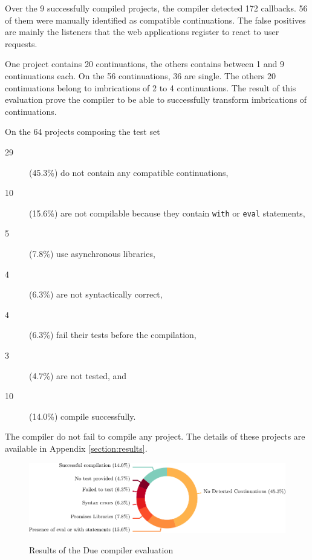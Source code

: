 Over the 9 successfully compiled projects, the compiler detected 172 callbacks.
56 of them were manually identified as compatible continuations.
The false positives are mainly the listeners that the web applications register to react to user requests.

One project contains 20 continuations, the others contains between 1 and 9 continuations each.
On the 56 continuations, 36 are single. %
The others 20 continuations belong to imbrications of 2 to 4 continuations.
The result of this evaluation prove the compiler to be able to successfully transform imbrications of continuations.

On the 64 projects composing the test set
\begin{description}
\item[29] (45.3\%) do not contain any compatible continuations,
\item[10] (15.6\%) are not compilable because they contain \texttt{with} or \texttt{eval} statements,
\item[5] (7.8\%) use asynchronous libraries,
\item[4] (6.3\%) are not syntactically correct,
\item[4] (6.3\%) fail their tests before the compilation,
\item[3] (4.7\%) are not tested, and
\item[10] (14.0\%) compile successfully.
\end{description}
The compiler do not fail to compile any project.
The details of these projects are available in Appendix \ref{section:results}.

\begin{figure}
  \centering
  \includegraphics[width=\linewidth]{../resources/due-evaluation.pdf}
  \label{fig:due-evaluation}
  \caption{Results of the Due compiler evaluation}
\end{figure}



